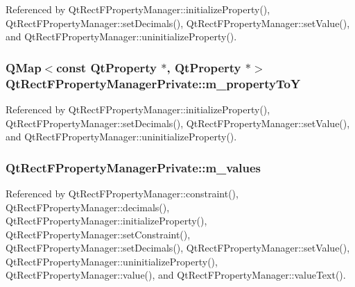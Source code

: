 Referenced by Qt\+Rect\+F\+Property\+Manager\+::initialize\+Property(), Qt\+Rect\+F\+Property\+Manager\+::set\+Decimals(), Qt\+Rect\+F\+Property\+Manager\+::set\+Value(), and Qt\+Rect\+F\+Property\+Manager\+::uninitialize\+Property().

\subsubsection[{m\+\_\+property\+ToY}]{\setlength{\rightskip}{0pt plus 5cm}Q\+Map$<$const {\bf Qt\+Property} $\ast$, {\bf Qt\+Property} $\ast$$>$ Qt\+Rect\+F\+Property\+Manager\+Private\+::m\+\_\+property\+ToY}\label{classQtRectFPropertyManagerPrivate_a9664f079a315373999320feb7bb82014}


Referenced by Qt\+Rect\+F\+Property\+Manager\+::initialize\+Property(), Qt\+Rect\+F\+Property\+Manager\+::set\+Decimals(), Qt\+Rect\+F\+Property\+Manager\+::set\+Value(), and Qt\+Rect\+F\+Property\+Manager\+::uninitialize\+Property().

\subsubsection[{m\+\_\+values}]{ Qt\+Rect\+F\+Property\+Manager\+Private\+::m\+\_\+values}\label{classQtRectFPropertyManagerPrivate_a8d9914644529d9666a95196c5ec56ecc}


Referenced by Qt\+Rect\+F\+Property\+Manager\+::constraint(), Qt\+Rect\+F\+Property\+Manager\+::decimals(), Qt\+Rect\+F\+Property\+Manager\+::initialize\+Property(), Qt\+Rect\+F\+Property\+Manager\+::set\+Constraint(), Qt\+Rect\+F\+Property\+Manager\+::set\+Decimals(), Qt\+Rect\+F\+Property\+Manager\+::set\+Value(), Qt\+Rect\+F\+Property\+Manager\+::uninitialize\+Property(), Qt\+Rect\+F\+Property\+Manager\+::value(), and Qt\+Rect\+F\+Property\+Manager\+::value\+Text().


